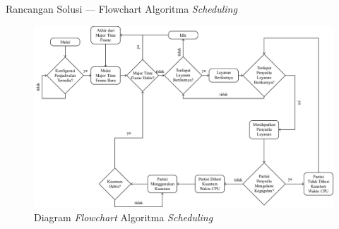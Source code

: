 \documentclass[xetex]{beamer}
\begin{document}
\begin{frame}{Rancangan Solusi --- Flowchart Algoritma \textit{Scheduling}}
	\centering
	\begin{figure}
		\includegraphics[scale=0.18]{./final-project-figure2.png}
		\caption{Diagram \textit{Flowchart} Algoritma \textit{Scheduling}}
	\end{figure}
\end{frame}
\end{document}
